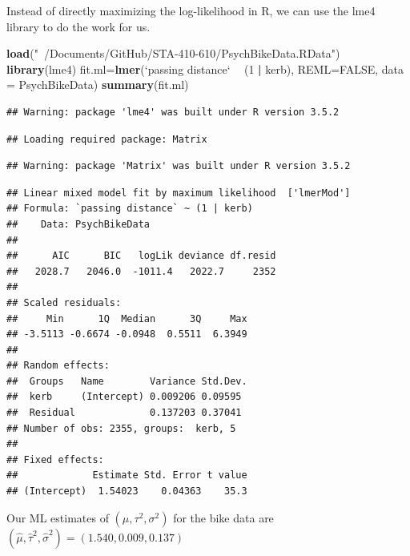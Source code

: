 \documentclass[ignorenonframetext,]{beamer}
\newenvironment{Shaded}{\begin{snugshade}}{\end{snugshade}}
\newcommand{\KeywordTok}[1]{\textcolor[rgb]{0.13,0.29,0.53}{\textbf{#1}}}
\newcommand{\DataTypeTok}[1]{\textcolor[rgb]{0.13,0.29,0.53}{#1}}
\newcommand{\DecValTok}[1]{\textcolor[rgb]{0.00,0.00,0.81}{#1}}
\newcommand{\StringTok}[1]{\textcolor[rgb]{0.31,0.60,0.02}{#1}}
\newcommand{\OtherTok}[1]{\textcolor[rgb]{0.56,0.35,0.01}{#1}}
\newcommand{\OperatorTok}[1]{\textcolor[rgb]{0.81,0.36,0.00}{\textbf{#1}}}
\newcommand{\NormalTok}[1]{#1}
\begin{document}
\begin{frame}[fragile]{}

Instead of directly maximizing the log-likelihood in R, we can use the
lme4 library to do the work for us.

\begin{Shaded}
\begin{Highlighting}[]
\KeywordTok{load}\NormalTok{(}\StringTok{"~/Documents/GitHub/STA-410-610/PsychBikeData.RData"}\NormalTok{)}
\KeywordTok{library}\NormalTok{(lme4)}
\NormalTok{fit.ml=}\KeywordTok{lmer}\NormalTok{(}\StringTok{`}\DataTypeTok{passing distance}\StringTok{`} \OperatorTok{~}\StringTok{ }\NormalTok{(}\DecValTok{1} \OperatorTok{|}\StringTok{ }\NormalTok{kerb), }\DataTypeTok{REML=}\OtherTok{FALSE}\NormalTok{, }\DataTypeTok{data =}\NormalTok{ PsychBikeData)}
\KeywordTok{summary}\NormalTok{(fit.ml)}
\end{Highlighting}
\end{Shaded}

\end{frame}

\begin{frame}[fragile]{}

\begin{verbatim}
## Warning: package 'lme4' was built under R version 3.5.2
\end{verbatim}

\begin{verbatim}
## Loading required package: Matrix
\end{verbatim}

\begin{verbatim}
## Warning: package 'Matrix' was built under R version 3.5.2
\end{verbatim}

\begin{verbatim}
## Linear mixed model fit by maximum likelihood  ['lmerMod']
## Formula: `passing distance` ~ (1 | kerb)
##    Data: PsychBikeData
## 
##      AIC      BIC   logLik deviance df.resid 
##   2028.7   2046.0  -1011.4   2022.7     2352 
## 
## Scaled residuals: 
##     Min      1Q  Median      3Q     Max 
## -3.5113 -0.6674 -0.0948  0.5511  6.3949 
## 
## Random effects:
##  Groups   Name        Variance Std.Dev.
##  kerb     (Intercept) 0.009206 0.09595 
##  Residual             0.137203 0.37041 
## Number of obs: 2355, groups:  kerb, 5
## 
## Fixed effects:
##             Estimate Std. Error t value
## (Intercept)  1.54023    0.04363    35.3
\end{verbatim}

Our ML estimates of \((\mu,\tau^2,\sigma^2)\) for the bike data are
\((\widehat{\mu},\widehat{\tau}^2,\widehat{\sigma}^2)=(1.540, 0.009, 0.137)\)

\end{frame}
\end{document}
